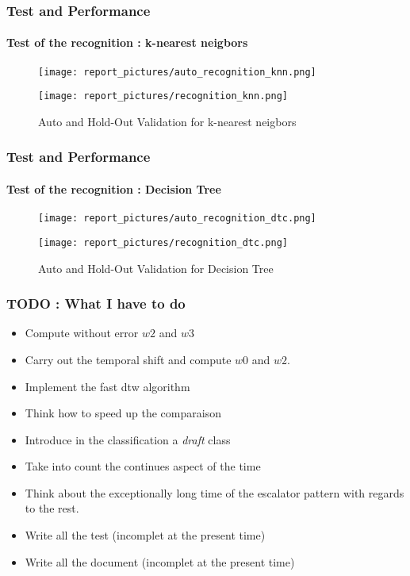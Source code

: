 \documentclass[11pt, sans, handout]{beamer}
\begin{document}
\begin{frame}
	\frametitle{Test and Performance}
	\framesubtitle{Test of the recognition : k-nearest neigbors}
			
	\begin{figure}[H]
			\begin{minipage}[c]{.46\linewidth}
      			\texttt{[image: report\_pictures/auto\_recognition\_knn.png]}
  			\end{minipage} \hfill
   			\begin{minipage}[c]{.46\linewidth}
      			\texttt{[image: report\_pictures/recognition\_knn.png]}
   			\end{minipage}
		\caption{Auto and Hold-Out Validation for k-nearest neigbors}
		\label{knn}
	\end{figure}
	
\end{frame}

\begin{frame}
	\frametitle{Test and Performance}
	\framesubtitle{Test of the recognition : Decision Tree}
			
	\begin{figure}[H]
			\begin{minipage}[c]{.46\linewidth}
      			\texttt{[image: report\_pictures/auto\_recognition\_dtc.png]}
  			\end{minipage} \hfill
   			\begin{minipage}[c]{.46\linewidth}
      			\texttt{[image: report\_pictures/recognition\_dtc.png]}
   			\end{minipage}
		\caption{Auto and Hold-Out Validation for Decision Tree}
		\label{dtc}
	\end{figure}
	
\end{frame}

\begin{frame}
	\frametitle{TODO : What I have to do}
	
	\begin{itemize}
	\item Compute without error $w2$ and $w3$
	\item Carry out the temporal shift and compute $w0$ and $w2$.
	\item Implement the fast dtw algorithm
	\item Think how to speed up the comparaison
	\item Introduce in the classification a \textit{draft} class
	\item Take into count the continues aspect of the time
	\item Think about the exceptionally long time of the escalator pattern with  regards to the rest.
	\item Write all the test (incomplet at the present time)
	\item Write all the document (incomplet at the present time)
	\end{itemize}
\end{frame}	

%        
%        
\end{document}
